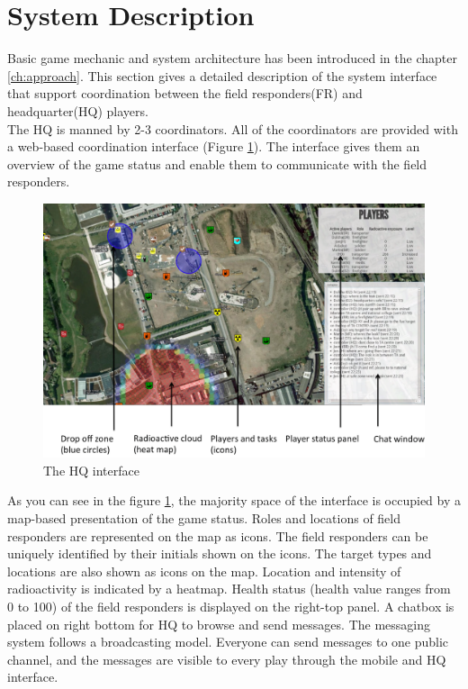 \section{System Description}\label{sec:study3system}
Basic game mechanic and system architecture has been introduced in the chapter \ref{ch:approach}. This section gives a detailed description of the system interface that support coordination between the field responders(FR) and headquarter(HQ) players. \\

The HQ is manned by 2-3 coordinators. All of the coordinators are provided with a web-based coordination interface (Figure \ref{fig:HQinterface}). The interface gives them an overview of the game status and enable them to communicate with the field responders. \\

\begin{figure}[h]
  \centering
  \includegraphics[width=1\textwidth]{img/study1/webinterface}
  \caption{The HQ interface}
  \label{fig:HQinterface}
\end{figure}

As you can see in the figure \ref{fig:HQinterface}, the majority space of the interface is occupied by a map-based presentation of the game status. Roles and locations of field responders are represented on the map as icons. The field responders can be uniquely identified by their initials shown on the icons. The target types and locations are also shown as icons on the map. Location and intensity of radioactivity is indicated by a heatmap. Health status (health value ranges from 0 to 100) of the field responders is displayed on the right-top panel. A chatbox is placed on right bottom for HQ to browse and send messages. The messaging system follows a broadcasting model. Everyone can send messages to one public channel, and the messages are visible to every play through the mobile and HQ interface.\\

